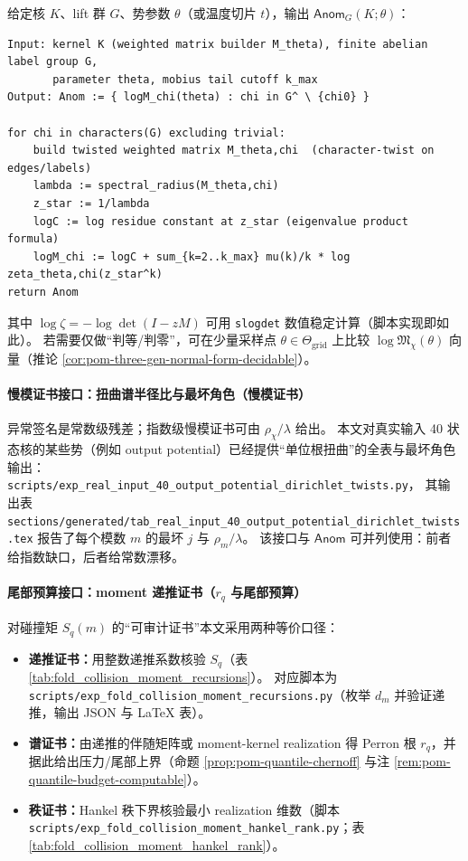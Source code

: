 \begin{remark}\label{rem:pom-anom-pseudocode}
给定核 \(K\)、lift 群 \(G\)、势参数 \(\theta\)（或温度切片 \(t\)），输出 \(\mathsf{Anom}_G(K;\theta)\)：
\begin{verbatim}
Input: kernel K (weighted matrix builder M_theta), finite abelian label group G,
       parameter theta, mobius tail cutoff k_max
Output: Anom := { logM_chi(theta) : chi in G^ \ {chi0} }

for chi in characters(G) excluding trivial:
    build twisted weighted matrix M_theta,chi  (character-twist on edges/labels)
    lambda := spectral_radius(M_theta,chi)
    z_star := 1/lambda
    logC := log residue constant at z_star (eigenvalue product formula)
    logM_chi := logC + sum_{k=2..k_max} mu(k)/k * log zeta_theta,chi(z_star^k)
return Anom
\end{verbatim}
其中 \(\log\zeta=-\log\det(I-zM)\) 可用 \texttt{slogdet} 数值稳定计算（脚本实现即如此）。
若需要仅做“判等/判零”，可在少量采样点 \(\theta\in\Theta_{\mathrm{grid}}\) 上比较 \(\log\mathfrak{M}_\chi(\theta)\) 向量（推论 \ref{cor:pom-three-gen-normal-form-decidable}）。
\end{remark}

\paragraph{慢模证书接口：扭曲谱半径比与最坏角色（慢模证书）}
异常签名是常数级残差；指数级慢模证书可由 \(\rho_\chi/\lambda\) 给出。
本文对真实输入 40 状态核的某些势（例如 output potential）已经提供“单位根扭曲”的全表与最坏角色输出：
\texttt{scripts/exp\_real\_input\_40\_output\_potential\_dirichlet\_twists.py}，
其输出表 \texttt{sections/generated/tab\_real\_input\_40\_output\_potential\_dirichlet\_twists.tex}
报告了每个模数 \(m\) 的最坏 \(j\) 与 \(\rho_m/\lambda\)。
该接口与 \(\mathsf{Anom}\) 可并列使用：前者给指数缺口，后者给常数漂移。

\paragraph{尾部预算接口：moment 递推证书（\texorpdfstring{$r_q$}{rq} 与尾部预算）}
对碰撞矩 \(S_q(m)\) 的“可审计证书”本文采用两种等价口径：
\begin{itemize}
  \item \textbf{递推证书：}用整数递推系数核验 \(S_q\)（表 \ref{tab:fold_collision_moment_recursions}）。
  对应脚本为 \texttt{scripts/exp\_fold\_collision\_moment\_recursions.py}（枚举 \(d_m\) 并验证递推，输出 JSON 与 LaTeX 表）。
  \item \textbf{谱证书：}由递推的伴随矩阵或 moment-kernel realization 得 Perron 根 \(r_q\)，并据此给出压力/尾部上界（命题 \ref{prop:pom-quantile-chernoff} 与注 \ref{rem:pom-quantile-budget-computable}）。
  \item \textbf{秩证书：}Hankel 秩下界核验最小 realization 维数（脚本 \texttt{scripts/exp\_fold\_collision\_moment\_hankel\_rank.py}；表 \ref{tab:fold_collision_moment_hankel_rank}）。
  \end{itemize}

